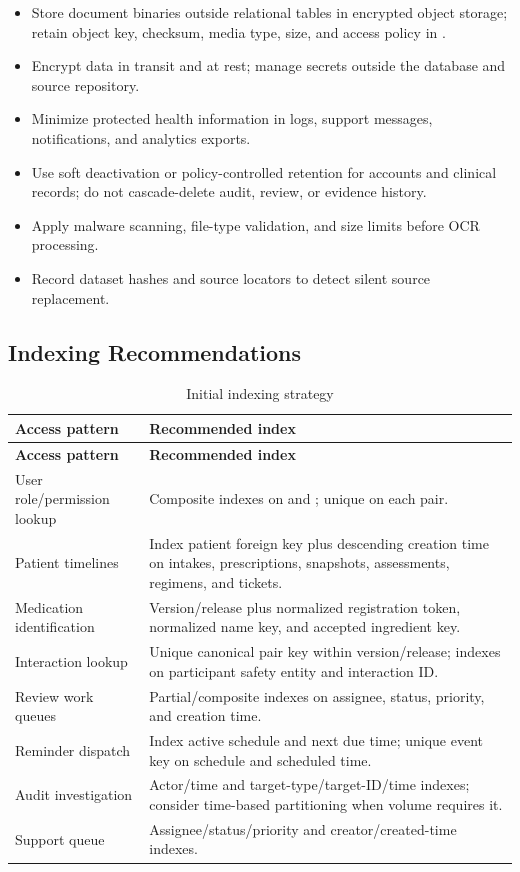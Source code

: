 \begin{itemize}
  \item Store document binaries outside relational tables in encrypted object storage; retain object key, checksum, media type, size, and access policy in .
  \item Encrypt data in transit and at rest; manage secrets outside the database and source repository.
  \item Minimize protected health information in logs, support messages, notifications, and analytics exports.
  \item Use soft deactivation or policy-controlled retention for accounts and clinical records; do not cascade-delete audit, review, or evidence history.
  \item Apply malware scanning, file-type validation, and size limits before OCR processing.
  \item Record dataset hashes and source locators to detect silent source replacement.
\end{itemize}

\subsection{Indexing Recommendations}

\begin{longtable}{L{5.2cm}L{10.0cm}}
\caption{Initial indexing strategy}\label{tab:indexes}\\
\toprule
\textbf{Access pattern} & \textbf{Recommended index}\\
\midrule
\endfirsthead
\toprule
\textbf{Access pattern} & \textbf{Recommended index}\\
\midrule
\endhead
User role/permission lookup & Composite indexes on  and ; unique on each pair.\\
Patient timelines & Index patient foreign key plus descending creation time on intakes, prescriptions, snapshots, assessments, regimens, and tickets.\\
Medication identification & Version/release plus normalized registration token, normalized name key, and accepted ingredient key.\\
Interaction lookup & Unique canonical pair key within version/release; indexes on participant safety entity and interaction ID.\\
Review work queues & Partial/composite indexes on assignee, status, priority, and creation time.\\
Reminder dispatch & Index active schedule and next due time; unique event key on schedule and scheduled time.\\
Audit investigation & Actor/time and target-type/target-ID/time indexes; consider time-based partitioning when volume requires it.\\
Support queue & Assignee/status/priority and creator/created-time indexes.\\
\bottomrule
\end{longtable}

